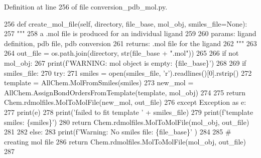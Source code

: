 Definition at line 256 of file conversion\+\_\+pdb\+\_\+mol.\+py.


\begin{DoxyCode}
256     \textcolor{keyword}{def }create\_mol\_file(self, directory, file\_base, mol\_obj, smiles\_file=None):
257         \textcolor{stringliteral}{"""}
258 \textcolor{stringliteral}{        a .mol file is produced for an individual ligand}
259 \textcolor{stringliteral}{}
260 \textcolor{stringliteral}{        params: ligand definition, pdb file, pdb conversion}
261 \textcolor{stringliteral}{        returns: .mol file for the ligand}
262 \textcolor{stringliteral}{        """}
263 
264         out\_file = os.path.join(directory, str(file\_base + \textcolor{stringliteral}{".mol"}))
265 
266         \textcolor{keywordflow}{if} \textcolor{keywordflow}{not} mol\_obj:
267             print(f\textcolor{stringliteral}{'WARNING: mol object is empty: \{file\_base\}'})
268 
269         \textcolor{keywordflow}{if} smiles\_file:
270             \textcolor{keywordflow}{try}:
271                 smiles = open(smiles\_file, \textcolor{stringliteral}{'r').readlines()[0].rstrip()}
272 \textcolor{stringliteral}{                template = AllChem.MolFromSmiles(smiles)}
273 \textcolor{stringliteral}{                new\_mol = AllChem.AssignBondOrdersFromTemplate(template, mol\_obj)}
274 \textcolor{stringliteral}{}
275 \textcolor{stringliteral}{                }\textcolor{keywordflow}{return} Chem.rdmolfiles.MolToMolFile(new\_mol, out\_file)
276             \textcolor{keywordflow}{except} Exception \textcolor{keyword}{as} e:
277                 print(e)
278                 print(\textcolor{stringliteral}{'failed to fit template '} + smiles\_file)
279                 print(f\textcolor{stringliteral}{'template smiles: \{smiles\}'})
280                 \textcolor{keywordflow}{return} Chem.rdmolfiles.MolToMolFile(mol\_obj, out\_file)
281 
282         \textcolor{keywordflow}{else}:
283             print(f\textcolor{stringliteral}{'Warning: No smiles file: \{file\_base\}'} )
284 
285         \textcolor{comment}{# creating mol file}
286         \textcolor{keywordflow}{return} Chem.rdmolfiles.MolToMolFile(mol\_obj, out\_file)
287 
\end{DoxyCode}
\mbox{\label{classfragalysis__api_1_1xcimporter_1_1conversion__pdb__mol_1_1_ligand_ada1d85b43009efb4da6cf5b17c851783}} 
